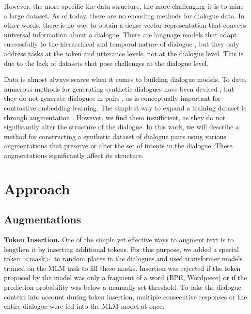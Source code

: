 \documentclass{article}
\begin{document}
However, the more specific the data structure, the more challenging it is to mine a large dataset. As of today, there are no encoding methods for dialogue data. In other words, there is no way to obtain a dense vector representation that conveys universal information about a dialogue. There are language models that adapt successfully to the hierarchical and temporal nature of dialogue \cite{zhang-etal-2023-dialog, li2022future}, but they only address tasks at the token and utterance levels, not at the dialogue level. This is due to the lack of datasets that pose challenges at the dialogue level.

Data is almost always scarce when it comes to building dialogue models. To date, numerous methods for generating synthetic dialogues have been devised \cite{kim2021neuralwoz, mohapatra2021simulated, wan-etal-2022-unified, zheng2023augesc}, but they do not generate dialogues in pairs \cite{schick2021generating}, as is conceptually important for contrastive embedding learning. The simplest way to expand a training dataset is through augmentation \cite{soudani2023data}. However, we find them insufficient, as they do not significantly alter the structure of the dialogue. In this work, we will describe a method for constructing a synthetic dataset of dialogue pairs using various augmentations that preserve or alter the set of intents in the dialogue. These augmentations significantly affect its structure.


\section{Approach}

\subsection{Augmentations}

\textbf{Token Insertion.} One of the simple yet effective ways to augment text is to lengthen it by inserting additional tokens. For this purpose, we added a special token `<mask>` to random places in the dialogues and used transformer models trained on the MLM task to fill these masks. Insertion was rejected if the token proposed by the model was only a fragment of a word (BPE, Wordpiece) or if the prediction probability was below a manually set threshold. To take the dialogue context into account during token insertion, multiple consecutive responses or the entire dialogue were fed into the MLM model at once.
\end{document}
